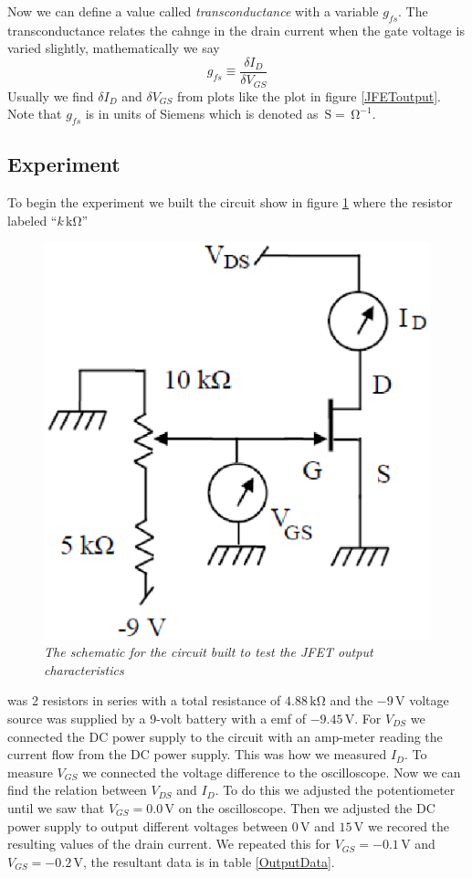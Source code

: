 \documentclass[11pt]{article}
\numberwithin{equation}{section}
\numberwithin{figure}{section}
\numberwithin{table}{section}
\newcommand{\unit}[1]{\ensuremath{\, \mathrm{#1}}}
\begin{document}
Now we can define a value called \emph{transconductance} with a variable $g_{fs}$. The transconductance relates the cahnge in the drain current when the gate voltage is varied slightly, mathematically we say
\begin{equation}
g_{fs}\equiv\frac{\delta I_D}{\delta V_{GS}}
\label{TransCon}
\end{equation}
Usually we find $\delta I_D$ and $\delta V_{GS}$ from plots like the plot in figure \ref{JFEToutput}. Note that $g_{fs}$ is in units of Siemens which is denoted as $\unit{S} = \unit{\Omega^{-1}}$. 

\subsection{Experiment}
To begin the experiment we built the circuit show in figure \ref{Part1JfetSchem} where the resistor labeled ``$k\unit{k\Omega}$''
\begin{figure}[h]
\centering
\includegraphics[scale=0.50]{Part1JfetSchem.eps}
\caption{\textit{The schematic for the circuit built to test the JFET output characteristics}}
\label{Part1JfetSchem}
\end{figure} 
 was 2 resistors in series with a total resistance of $4.88\unit{k\Omega}$ and the $-9\unit{V}$ voltage source was supplied by a 9-volt battery with a emf of $-9.45\unit{V}$. For $V_{DS}$ we connected the DC power supply to the circuit with an amp-meter reading the current flow from the DC power supply. This was how we measured $I_D$. To measure $V_{GS}$ we connected the voltage difference to the oscilloscope. Now we can find the relation between $V_{DS}$ and $I_D$. To do this we adjusted the potentiometer until we saw that $V_{GS}=0.0\unit{V}$ on the oscilloscope. Then we adjusted the DC power supply to output different voltages between $0\unit{V}$ and $15\unit{V}$ we recored the resulting values of the drain current. We repeated this for $V_{GS}=-0.1\unit{V}$ and $V_{GS}=-0.2\unit{V}$, the resultant data is in table \ref{OutputData}.
\end{document}

